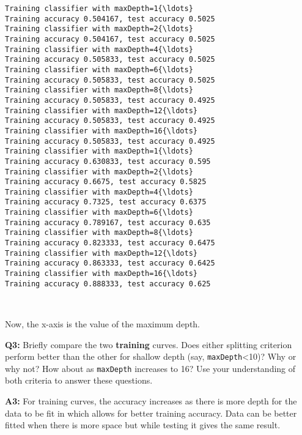 \documentclass[11pt]{article}
\begin{document}
    \begin{Verbatim}[commandchars=\\\{\}]
Training classifier with maxDepth=1{\ldots}
Training accuracy 0.504167, test accuracy 0.5025
Training classifier with maxDepth=2{\ldots}
Training accuracy 0.504167, test accuracy 0.5025
Training classifier with maxDepth=4{\ldots}
Training accuracy 0.505833, test accuracy 0.5025
Training classifier with maxDepth=6{\ldots}
Training accuracy 0.505833, test accuracy 0.5025
Training classifier with maxDepth=8{\ldots}
Training accuracy 0.505833, test accuracy 0.4925
Training classifier with maxDepth=12{\ldots}
Training accuracy 0.505833, test accuracy 0.4925
Training classifier with maxDepth=16{\ldots}
Training accuracy 0.505833, test accuracy 0.4925
Training classifier with maxDepth=1{\ldots}
Training accuracy 0.630833, test accuracy 0.595
Training classifier with maxDepth=2{\ldots}
Training accuracy 0.6675, test accuracy 0.5825
Training classifier with maxDepth=4{\ldots}
Training accuracy 0.7325, test accuracy 0.6375
Training classifier with maxDepth=6{\ldots}
Training accuracy 0.789167, test accuracy 0.635
Training classifier with maxDepth=8{\ldots}
Training accuracy 0.823333, test accuracy 0.6475
Training classifier with maxDepth=12{\ldots}
Training accuracy 0.863333, test accuracy 0.6425
Training classifier with maxDepth=16{\ldots}
Training accuracy 0.888333, test accuracy 0.625

    \end{Verbatim}

    \begin{center}
    \end{center}
    { \hspace*{\fill} \\}
    
    Now, the x-axis is the value of the maximum depth.

    \textbf{Q3:} Briefly compare the two \textbf{training} curves. Does
either splitting criterion perform better than the other for shallow
depth (say, \texttt{maxDepth}\textless{}10)? Why or why not? How about
as \texttt{maxDepth} increases to 16? Use your understanding of both
criteria to answer these questions.

    \textbf{A3:} For training curves, the accuracy increases as there is
more depth for the data to be fit in which allows for better training
accuracy. Data can be better fitted when there is more space but while
testing it gives the same result.
\end{document}

